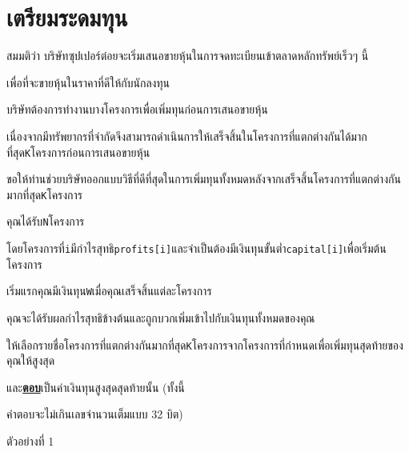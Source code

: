 \documentclass{article}
\begin{document}
\section*{เตรียมระดมทุน}

สมมติว่า บริษัทซุปเปอร์ต๋อยจะเริ่มเสนอขายหุ้นในการจดทะเบียนเข้าตลาดหลักทรัพย์เร็วๆ นี้

เพื่อที่จะขายหุ้นในราคาที่ดีให้กับนักลงทุน

บริษัทต้องการทำงานบางโครงการเพื่อเพิ่มทุนก่อนการเสนอขายหุ้น

เนื่องจากมีทรัพยากรที่จำกัดจึงสามารถดำเนินการให้เสร็จสิ้นในโครงการที่แตกต่างกันได้มากที่สุด\texttt{K}โครงการก่อนการเสนอขายหุ้น

ขอให้ท่านช่วยบริษัทออกแบบวิธีที่ดีที่สุดในการเพิ่มทุนทั้งหมดหลังจากเสร็จสิ้นโครงการที่แตกต่างกันมากที่สุด\texttt{K}โครงการ



คุณได้รับ\texttt{N}โครงการ

โดยโครงการที่\texttt{i}มีกำไรสุทธิ\texttt{profits{[}i{]}}และจำเป็นต้องมีเงินทุนขั้นต่ำ\texttt{capital{[}i{]}}เพื่อเริ่มต้นโครงการ



เริ่มแรกคุณมีเงินทุน\texttt{W}เมื่อคุณเสร็จสิ้นแต่ละโครงการ

คุณจะได้รับผลกำไรสุทธิข้างต้นและถูกบวกเพิ่มเข้าไปกับเงินทุนทั้งหมดของคุณ



ให้เลือกรายชื่อโครงการที่แตกต่างกันมากที่สุด\texttt{K}โครงการจากโครงการที่กำหนดเพื่อเพิ่มทุนสุดท้ายของคุณให้สูงสุด

และ\textbf{\ul{ตอบ}}เป็นค่าเงินทุนสูงสุดสุดท้ายนั้น (ทั้งนี้

คำตอบจะไม่เกินเลขจำนวนเต็มแบบ 32 บิต)



\hfill\break



{ตัวอย่างที่ 1}
\end{document}
